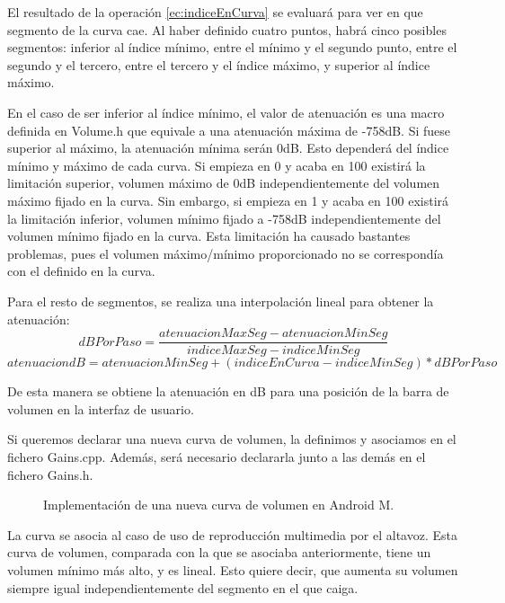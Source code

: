 El resultado de la operación \ref{ec:indiceEnCurva} se evaluará para ver en que segmento de la curva cae. Al haber definido cuatro puntos, habrá cinco posibles segmentos: inferior al índice mínimo, entre el mínimo y el segundo punto, entre el segundo y el tercero, entre el tercero y el índice máximo, y superior al índice máximo. 

En el caso de ser inferior al índice mínimo, el valor de atenuación es una macro definida en Volume.h que equivale a una atenuación máxima de -758\gls{dB}. Si fuese superior al máximo, la atenuación mínima serán 0\gls{dB}. Esto dependerá del índice mínimo y máximo de cada curva. Si empieza en 0 y acaba en 100 existirá la limitación superior, volumen máximo de 0\gls{dB} independientemente del volumen máximo fijado en la curva. Sin embargo, si empieza en 1 y acaba en 100 existirá la limitación inferior, volumen mínimo fijado a -758\gls{dB} independientemente del volumen mínimo fijado en la curva. Esta limitación ha causado bastantes problemas, pues el volumen máximo/mínimo proporcionado no se correspondía con el definido en la curva.

Para el resto de segmentos, se realiza una interpolación lineal para obtener la atenuación:
\begin{equation}
dBPorPaso=\frac{atenuacionMaxSeg-atenuacionMinSeg}{indiceMaxSeg-indiceMinSeg}
\end{equation}
\begin{equation}\label{ec:atenuaciondB}
atenuaciondB=atenuacionMinSeg+(indiceEnCurva-indiceMinSeg)*dBPorPaso
\end{equation}

De esta manera se obtiene la atenuación en \gls{dB} para una posición de la barra de volumen en la interfaz de usuario.

Si queremos declarar una nueva curva de volumen, la definimos y asociamos en el fichero Gains.cpp. Además, será necesario declararla junto a las demás en el fichero Gains.h.

\begin{figure}[H]
	\centering
	\caption{Implementación de una nueva curva de volumen en Android M.} \label{fig:curva_propia}
\end{figure}

La curva se asocia al caso de uso de reproducción multimedia por el altavoz. Esta curva de volumen, comparada con la que se asociaba anteriormente, tiene un volumen mínimo más alto, y es lineal. Esto quiere decir, que aumenta su volumen siempre igual independientemente del segmento en el que caiga.

